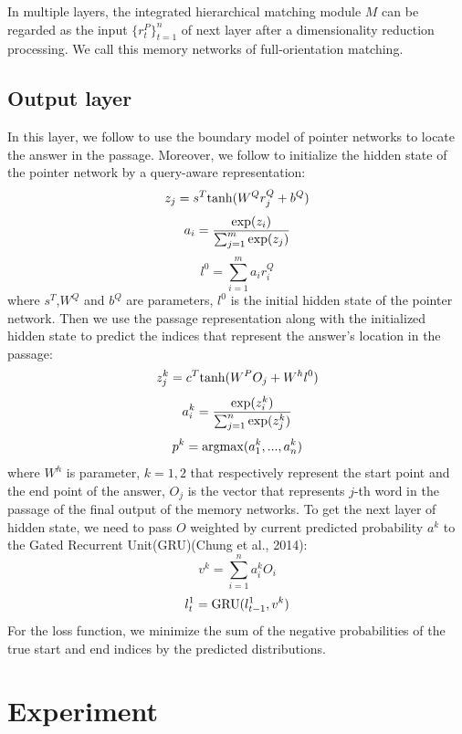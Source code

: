 \documentclass[letterpaper]{article}
\begin{document}
In multiple layers, the integrated hierarchical matching module $M$ can be regarded as the input $\{ r^{P}_{t} \}^{n}_{t=1}$ of next layer after a dimensionality reduction processing. We call this memory networks of full-orientation matching.


\subsection{Output layer}
In this layer, we follow \citet{wang2016machine} to use the boundary model of pointer networks \citep{vinyals2015pointer} to locate the answer in the passage. Moreover, we follow \cite{rnet} to initialize the hidden state of the pointer network by a query-aware representation:
$$z_j = s^T {\rm tanh} (W^{Q} r^{Q}_{j} + b^{Q})$$
$$a_i = \frac{{\rm exp}(z_i)}{\sum^{m}_{j = 1} {\rm exp}(z_j)}$$
$$l^{0} = \sum^{m}_{i = 1}a_i r^{Q}_{i}$$
where $ s^T$,$W^{Q}$ and $b^{Q}$ are parameters, $l^{0}$ is the initial hidden state of the pointer network. Then we use the passage representation along with the initialized hidden state to predict the indices that represent the answer's location in the passage:
$$z^{k}_{j} = c^T {\rm tanh} (W^{P} O_{j} + W^{h} l^{0})$$
$$a^{k}_{i} = \frac{{\rm exp}(z^{k}_i)}{\sum^{n}_{j = 1} {\rm exp}(z^{k}_j)}$$
$$p^{k} = {\rm argmax}(a^{k}_{1}, ..., a^{k}_{n})$$
where $W^{h}$ is parameter, $k = 1,2$ that respectively represent the start point and the end point of the answer, $O_{j}$ is the vector that represents $j$-th word in the passage of the final output of the memory networks. To get the next layer of hidden state, we need to pass $O$ weighted by current predicted probability $a^{k}$ to the Gated Recurrent Unit(GRU)(Chung et al., 2014):
$$v^{k} = \sum_{i = 1}^{n} a^{k}_{i}O_{i}$$
$$l^{1}_{t} = {\rm GRU}(l^{1}_{t-1}, v^{k})$$
For the loss function, we minimize the sum of the negative probabilities of the true start and end indices by the predicted distributions.






\section{Experiment}
\end{document}
